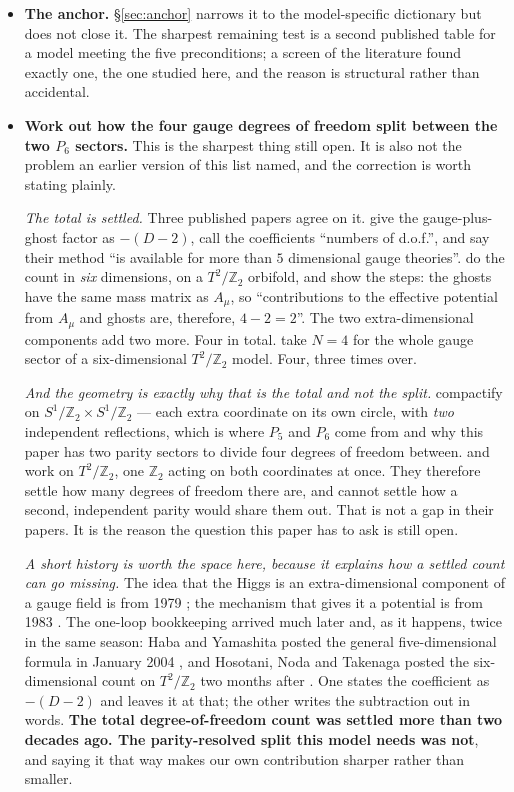 \documentclass[11pt,a4paper]{article}
\newcommand{\ZZ}{\mathbb{Z}}
\begin{document}
\begin{itemize}\itemsep2pt
\item \textbf{The anchor.} \S\ref{sec:anchor} narrows it to the model-specific dictionary but does
not close it. The sharpest remaining test is a second published table for a model meeting the five
preconditions; a screen of the literature found exactly one, the one studied here, and the reason is
structural rather than accidental.
\item \textbf{Work out how the four gauge degrees of freedom split between the two $P_6$ sectors.}
This is the sharpest thing still open. It is also not the problem an earlier version of this list
named, and the correction is worth stating plainly.

\emph{The total is settled.} Three published papers agree on it. \cite{HY04} give the
gauge-plus-ghost factor as $-(D-2)$, call the coefficients ``numbers of d.o.f.'', and say their
method ``is available for more than $5$ dimensional gauge theories''. \cite{HNT} do the count in
\emph{six} dimensions, on a $T^2/\ZZ_2$ orbifold, and show the steps: the ghosts have the same mass
matrix as $A_\mu$, so ``contributions to the effective potential from $A_\mu$ and ghosts are,
therefore, $4-2=2$''. The two extra-dimensional components add two more. Four in total.
\cite{AHMN} take $N=4$ for the whole gauge sector of a six-dimensional $T^2/\ZZ_2$ model.
Four, three times over.

\emph{And the geometry is exactly why that is the total and not the split.} \cite{KM25} compactify
on $S^1/\ZZ_2\times S^1/\ZZ_2$ --- each extra coordinate on its own circle, with \emph{two}
independent reflections, which is where $P_5$ and $P_6$ come from and why this paper has two parity
sectors to divide four degrees of freedom between. \cite{HNT} and \cite{AHMN} work on $T^2/\ZZ_2$,
one $\ZZ_2$ acting on both coordinates at once. They therefore settle how many degrees of freedom
there are, and cannot settle how a second, independent parity would share them out. That is not a
gap in their papers. It is the reason the question this paper has to ask is still open.

\emph{A short history is worth the space here, because it explains how a settled count can go
missing.} The idea that the Higgs is an extra-dimensional component of a gauge field is from
1979 \cite{Manton}; the mechanism that gives it a potential is from 1983 \cite{Hosotani}. The
one-loop bookkeeping arrived much later and, as it happens, twice in the same season: Haba and
Yamashita posted the general five-dimensional formula in January 2004 \cite{HY04}, and Hosotani,
Noda and Takenaga posted the six-dimensional count on $T^2/\ZZ_2$ two months after \cite{HNT}.
One states the coefficient as $-(D-2)$ and leaves it at that; the other writes the subtraction out
in words. \textbf{The total degree-of-freedom count was settled more than two decades ago. The
parity-resolved split this model needs was not}, and saying it that way makes our own contribution
sharper rather than smaller.


\end{itemize}
\end{document}
